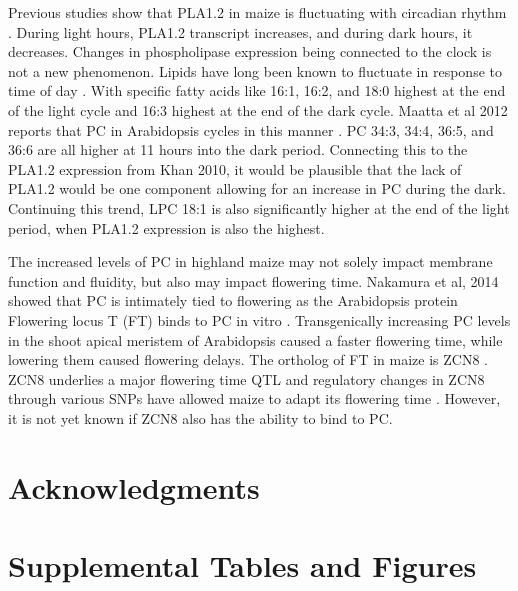 \documentclass[9pt,twocolumn,twoside,lineno]{gsajnl}
\begin{document}
Previous studies show that PLA1.2 in maize is fluctuating with circadian rhythm \cite{Khan2010-iv}. During light hours, PLA1.2 transcript increases, and during dark hours, it decreases. Changes in phospholipase expression being connected to the clock is not a new phenomenon. Lipids have long been known to fluctuate in response to time of day \cite{Browse1981-vt, Ekman2007-xe}. With specific fatty acids like 16:1, 16:2, and 18:0 highest at the end of the light cycle and 16:3 highest at the end of the dark cycle. Maatta et al 2012 reports that PC in Arabidopsis cycles in this manner \cite{Maatta2012-ip}. PC 34:3, 34:4, 36:5, and 36:6 are all higher at 11 hours into the dark period. Connecting this to the PLA1.2 expression from Khan 2010, it would be plausible that the lack of PLA1.2 would be one component allowing for an increase in PC during the dark. Continuing this trend, LPC 18:1 is also significantly higher at the end of the light period, when PLA1.2 expression is also the highest. 

The increased levels of PC in highland maize may not solely impact membrane function and fluidity, but also may impact flowering time. Nakamura et al, 2014 showed that PC is intimately tied to flowering as the Arabidopsis protein Flowering locus T (FT) binds to PC in vitro \cite{Nakamura2014-qf}.  Transgenically increasing PC levels in the shoot apical meristem of Arabidopsis caused a faster flowering time, while lowering them caused flowering delays. The ortholog of FT in maize is ZCN8 \cite{Lazakis2011-nq}. ZCN8 underlies a major flowering time QTL and regulatory changes in ZCN8 through various SNPs have allowed maize to adapt its flowering time \cite{Guo2019-pn}. However, it is not yet known if ZCN8 also has the ability to bind to PC.

\section{Acknowledgments}
\label{sec:acknowledgments}



\newpage  


\section*{Supplemental Tables and Figures}

\renewcommand{\thefigure}{S\arabic{figure}}
\renewcommand{\thetable}{S\arabic{table}}%
\linenumbers

\setcounter{figure}{0}
\setcounter{table}{0}
\end{document}
